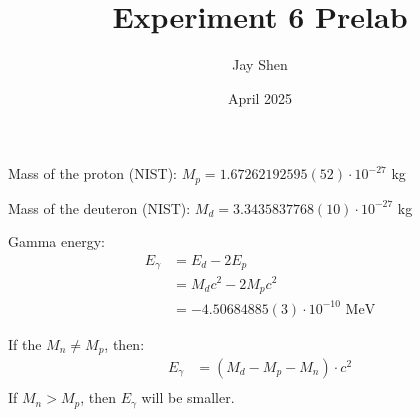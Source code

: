 \documentclass[12pt, letterpaper]{article}
\title{Experiment 6 Prelab}
\author{Jay Shen}
\date{April 2025}
\begin{document}
\maketitle

Mass of the proton (NIST): $M_p = 1.67262192595(52) \cdot 10^{-27}$ kg

Mass of the deuteron (NIST): $M_d = 3.3435837768(10) \cdot 10^{-27}$ kg

Gamma energy:
\begin{align*}
    E_\gamma &= E_d - 2 E_p \\
    &= M_d c^2 - 2 M_p c^2 \\
    &=−4.50684885(3) \cdot 10^{-10} \text{ MeV}
\end{align*}

If the $M_n \neq M_p$, then:
\begin{align*}
    E_\gamma &= (M_d - M_p - M_n) \cdot c^2\\
\end{align*}
If $M_n > M_p$, then $E_\gamma$ will be smaller. 
\end{document}
